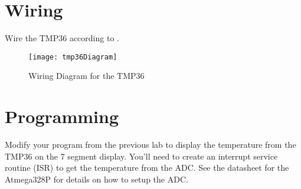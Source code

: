 \documentclass[main.tex]{subfile}
\begin{document}
\section{Wiring} 
\label{sec:wiring}

Wire the TMP36 according to .

\begin{figure}[H]
	\begin{center}
		\texttt{[image: tmp36Diagram]}
	\end{center}
	\caption{Wiring Diagram for the TMP36}
	\label{fig:tmp36Dia}
\end{figure}


\section{Programming} 
\label{sec:programming}

Modify your program from the previous lab to display the temperature from the
TMP36 on the 7 segment display. You'll need to create an interrupt service
routine (ISR) to get the temperature from the ADC. See the datasheet for the
Atmega328P for details on how to setup the ADC.


\end{document}
